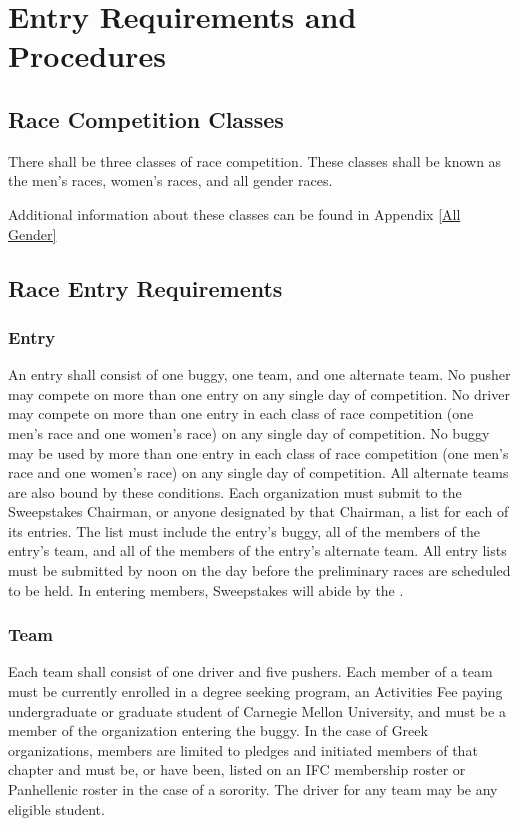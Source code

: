 \chapter{Entry Requirements and Procedures}

\section{Race Competition Classes}

	There shall be three classes of race competition. These classes shall be known as the men's races, women's races, and all gender races. 

	Additional information about these classes can be found in Appendix \ref*{All Gender}

\section{Race Entry Requirements}

\subsection{Entry}

An entry shall consist of one buggy, one team, and one alternate team. No pusher may compete on more than one entry on any single day of competition. No driver may compete on more than one entry in each class of race competition (one men's race and one women's race) on any single day of competition. No buggy may be used by more than one entry in each class of race competition (one men's race and one women's race) on any single day of competition. All alternate teams are also bound by these conditions. Each organization must submit to the Sweepstakes Chairman, or anyone designated by that Chairman, a list for each of its entries. The list must include the entry's buggy, all of the members of the entry's team, and all of the members of the entry's alternate team. All entry lists must be submitted by noon on the day before the preliminary races are scheduled to be held. In entering members, Sweepstakes will abide by the .

\subsection{Team}

	Each team shall consist of one driver and five pushers. Each member of a team must be currently enrolled in a degree seeking program, an Activities Fee paying undergraduate or graduate student of Carnegie Mellon University, and must be a member of the organization entering the buggy. In the case of Greek organizations, members are limited to pledges and initiated members of that chapter and must be, or have been, listed on an IFC membership roster or Panhellenic roster in the case of a sorority. The driver for any team may be any eligible student.

